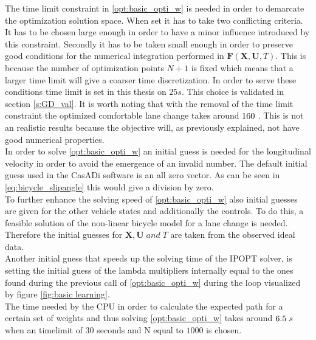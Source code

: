 The time limit constraint in \ref{opt:basic_opti_w} is needed in order to demarcate the optimization solution space. When set it has to take two conflicting criteria. It has to be chosen large enough in order to have a minor influence introduced by this constraint. Secondly it has to be taken small enough in order to preserve good conditions for the numerical integration performed in $\bm{F}(\bm{X},\bm{U}, T)$. This is because the number of optimization points $N+1$ is fixed which means that a larger time limit will give a coarser time discretization. In order to serve these conditions time limit is set in this thesis on $25 s$. This choice is validated in section \ref{s:GD_val}. It is worth noting that with the removal of the time limit constraint the optimized comfortable lane change takes around $160 \hspace{1mm}$. This is not an realistic results because the objective will, as previously explained, not have good numerical properties.\\ 

In order to solve \ref{opt:basic_opti_w} an initial guess is needed for the longitudinal velocity in order to avoid the emergence of an invalid number. The default initial guess used in the CasADi software is an all zero vector. As can be seen in \ref{eq:bicycle_slipangle} this would give a division by zero. \\
To further enhance the solving speed of \ref{opt:basic_opti_w} also initial guesses are given for the other vehicle states and additionally the controls. To do this, a feasible solution of the non-linear bicycle model for a lane change is needed. Therefore the initial guesses for $\bm{X}, \bm{U} \;and\; T$ are taken from the observed ideal data. \\

Another initial guess that speeds up the solving time of the IPOPT solver, is setting the initial guess of the lambda multipliers internally equal to the ones found during the previous call of \ref{opt:basic_opti_w} during the loop visualized by figure \ref{fig:basic learning}. \\

The time needed by the CPU in order to calculate the expected path for a certain set of weights and thus solving \ref{opt:basic_opti_w} takes around $6.5\hspace{1mm}s$ when an timelimit of $30$ seconds and N equal to $1000$ is chosen. 


